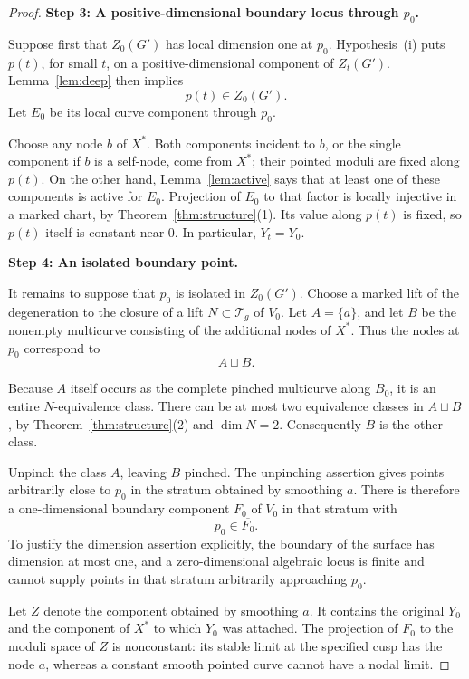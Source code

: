 \documentclass[11pt]{article}
\newcommand{\T}{\mathcal T}
\newcommand{\ol}[1]{\overline{#1}}
\theoremstyle{remark}
\begin{document}
\begin{proof}
\medskip
\noindent\textbf{Step 3: A positive-dimensional boundary locus
through \(p_0\).}

Suppose first that \(Z_0(G')\) has local dimension one at
\(p_0\). Hypothesis~(i) puts \(p(t)\), for small \(t\), on a
positive-dimensional component of \(Z_t(G')\).
Lemma~\ref{lem:deep} then implies
\[
p(t)\in Z_0(G').
\]
Let \(E_0\) be its local curve component through \(p_0\).

Choose any node \(b\) of \(X^\ast\). Both components incident
to \(b\), or the single component if \(b\) is a self-node,
come from \(X^\ast\); their pointed moduli are fixed along
\(p(t)\). On the other hand, Lemma~\ref{lem:active} says that
at least one of these components is active for \(E_0\).
Projection of \(E_0\) to that factor is locally injective in
a marked chart, by Theorem~\ref{thm:structure}(1).
Its value along \(p(t)\) is fixed, so \(p(t)\) itself is
constant near \(0\). In particular, \(Y_t=Y_0\).

\medskip
\noindent\textbf{Step 4: An isolated boundary point.}

It remains to suppose that \(p_0\) is isolated in \(Z_0(G')\).
Choose a marked lift of the degeneration to the closure of
a lift \(N\subset\T_g\) of \(V_0\).
Let \(A=\{a\}\), and let \(B\) be the nonempty multicurve
consisting of the additional nodes of \(X^\ast\).
Thus the nodes at \(p_0\) correspond to
\[
A\sqcup B.
\]

Because \(A\) itself occurs as the complete pinched multicurve
along \(B_0\), it is an entire \(N\)-equivalence class.
There can be at most two equivalence classes in \(A\sqcup B\),
by Theorem~\ref{thm:structure}(2) and \(\dim N=2\).
Consequently \(B\) is the other class.

Unpinch the class \(A\), leaving \(B\) pinched.
The unpinching assertion gives points arbitrarily close to
\(p_0\) in the stratum obtained by smoothing \(a\).
There is therefore a one-dimensional boundary component
\(F_0\) of \(V_0\) in that stratum with
\[
p_0\in\ol{F_0}.
\]
To justify the dimension assertion explicitly, the boundary of
the surface has dimension at most one, and a zero-dimensional
algebraic locus is finite and cannot supply points in that
stratum arbitrarily approaching \(p_0\).


Let \(Z\) denote the component obtained by smoothing \(a\).
It contains the original \(Y_0\) and the component of
\(X^\ast\) to which \(Y_0\) was attached.
The projection of \(F_0\) to the moduli space of \(Z\) is
nonconstant: its stable limit at the specified cusp has
the node \(a\), whereas a constant smooth pointed curve
cannot have a nodal limit.


\end{proof}
\end{document}
